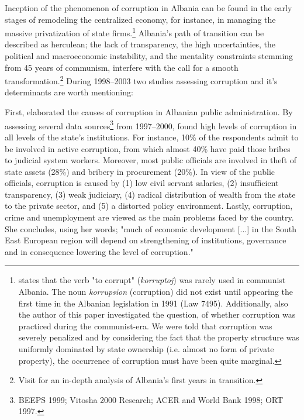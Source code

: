 Inception of the phenomenon of corruption in Albania can be found in the early stages of remodeling the centralized economy, for instance, in managing the massive privatization of state firms.\footnote{\citet[p. 3]{kajsiu2012discourse} states that the verb "to corrupt" ({\it korruptoj}) was rarely used in communist Albania. The noun {\it korrupsion} (corruption) did not exist until appearing the first time in the Albanian legislation in 1991 (Law 7495). Additionally, also the author of this paper investigated the question, of whether corruption was practiced during the communist-era. We were told that corruption was severely penalized and by considering the fact that the property structure was uniformly dominated by state ownership (i.e. almost no form of private property), the occurrence of corruption must have been quite marginal.} Albania's path of transition can be described as herculean; the lack of transparency, the high uncertainties, the political and macroeconomic instability, and the mentality constraints stemming from 45 years of communism, interfere with the call for a smooth transformation.\footnote{Visit \citet{muco1997economic} for an in-depth analysis of Albania's first years in transition.} During 1998--2003 two studies assessing corruption and it's determinants are worth mentioning: 

First, \citet{cepiku200412} elaborated the causes of corruption in Albanian public administration. By assessing several data sources\footnote{BEEPS 1999; Vitosha 2000 Research; ACER and World Bank 1998; ORT 1997.} from 1997--2000, \citet[pp. 112--115]{cepiku200412} found high levels of corruption in all levels of the state's institutions. For instance, 10\% of the respondents admit to be involved in active corruption, from which almost 40\% have paid those bribes to judicial system workers. Moreover, most public officials are involved in theft of state assets (28\%) and bribery in procurement (20\%). In view of the public officials, corruption is caused by (1) low civil servant salaries, (2) insufficient transparency, (3) weak judiciary, (4) radical distribution of wealth from the state to the private sector, and (5) a distorted policy environment. Lastly, corruption, crime and unemployment are viewed as the main problems faced by the country. She concludes, using her words; "much of economic development [...] in the South East European region will depend on strengthening of institutions, governance and in consequence lowering the level of corruption." \citep[p. 128]{cepiku200412} %

